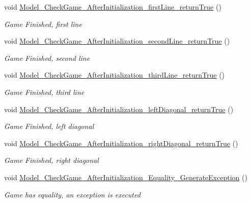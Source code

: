 \begin{DoxyCompactItemize}
void \hyperlink{class_test_morpion_1_1_game_test_a283990d10c073966a437f4f5c4db45a3}{Model\+\_\+\+Check\+Game\+\_\+\+After\+Initialization\+\_\+first\+Line\+\_\+return\+True} ()
\begin{DoxyCompactList}\small\item\em Game Finished, first line \end{DoxyCompactList}\item 
void \hyperlink{class_test_morpion_1_1_game_test_ac9b49f9c5c88e027ab3b01e6e4357314}{Model\+\_\+\+Check\+Game\+\_\+\+After\+Initialization\+\_\+second\+Line\+\_\+return\+True} ()
\begin{DoxyCompactList}\small\item\em Game Finished, second line \end{DoxyCompactList}\item 
void \hyperlink{class_test_morpion_1_1_game_test_aae466a04d74f8f9d11a217eea849a4af}{Model\+\_\+\+Check\+Game\+\_\+\+After\+Initialization\+\_\+third\+Line\+\_\+return\+True} ()
\begin{DoxyCompactList}\small\item\em Game Finished, third line \end{DoxyCompactList}\item 
void \hyperlink{class_test_morpion_1_1_game_test_afa27b41934a13a0889c6c6bd246baf76}{Model\+\_\+\+Check\+Game\+\_\+\+After\+Initialization\+\_\+left\+Diagonal\+\_\+return\+True} ()
\begin{DoxyCompactList}\small\item\em Game Finished, left diagonal \end{DoxyCompactList}\item 
void \hyperlink{class_test_morpion_1_1_game_test_a1c66ccd766ca98f6bc9c848a56398289}{Model\+\_\+\+Check\+Game\+\_\+\+After\+Initialization\+\_\+right\+Diagonal\+\_\+return\+True} ()
\begin{DoxyCompactList}\small\item\em Game Finished, right diagonal \end{DoxyCompactList}\item 
void \hyperlink{class_test_morpion_1_1_game_test_a5e003cb37646cbab42a6cd159e4a5662}{Model\+\_\+\+Check\+Game\+\_\+\+After\+Initialization\+\_\+\+Equality\+\_\+\+Generate\+Exception} ()
\begin{DoxyCompactList}\small\item\em Game has equality, an exception is executed \end{DoxyCompactList}\end{DoxyCompactItemize}


